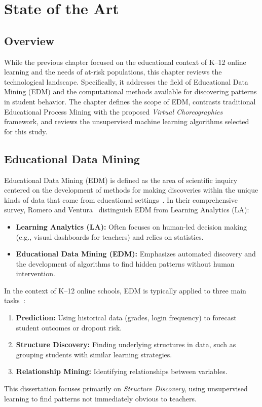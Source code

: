 \chapter{State of the Art}
\label{chap:stateofart}


\section{Overview}
While the previous chapter focused on the educational context of K--12 online learning and the needs of at-risk populations, this chapter reviews the technological landscape.
Specifically, it addresses the field of Educational Data Mining (EDM) and the computational methods available for discovering patterns in student behavior.
The chapter defines the scope of EDM, contrasts traditional Educational Process Mining with the proposed \textit{Virtual Choreographies} framework, and reviews the unsupervised machine learning algorithms selected for this study.

\section{Educational Data Mining}
\label{sec:edm}
Educational Data Mining (EDM) is defined as the area of scientific inquiry centered on the development of methods for making discoveries within the unique kinds of data that come from educational settings~\cite{romero_edm_survey}.
In their comprehensive survey, Romero and Ventura~\cite{romero_edm_survey} distinguish EDM from Learning Analytics (LA):
\begin{itemize}
    \item \textbf{Learning Analytics (LA):} Often focuses on human-led decision making (e.g., visual dashboards for teachers) and relies on statistics.
    \item \textbf{Educational Data Mining (EDM):} Emphasizes automated discovery and the development of algorithms to find hidden patterns without human intervention.
\end{itemize}

In the context of K--12 online schools, EDM is typically applied to three main tasks~\cite{romero_edm_survey}:
\begin{enumerate}
    \item \textbf{Prediction:} Using historical data (grades, login frequency) to forecast student outcomes or dropout risk.
    \item \textbf{Structure Discovery:} Finding underlying structures in data, such as grouping students with similar learning strategies.
    \item \textbf{Relationship Mining:} Identifying relationships between variables.
\end{enumerate}
This dissertation focuses primarily on \textit{Structure Discovery}, using unsupervised learning to find patterns not immediately obvious to teachers.

